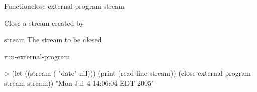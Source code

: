 \documentclass[10pt,twoside,english,pdftex]{article}
\begin{document}

\begin{functiondoc}{Function}{close-external-program-stream}{}
%
%

\fnsyntax

%
\fnpurpose Close a stream created by
\textbf{}

\fnpackage {}

\fnmodule {}

\fnargs
\begin{args}{stream}
\arg[stream] The stream to be closed
\end{args}

\begin{alsos}{run-external-program}
\end{alsos}

%
\fnexample
%
\W\supp
\begin{example}
> (let ((stream ( "date" nil)))
     (print (read-line stream))
     (close-external-program-stream stream))
"Mon Jul  4 14:06:04 EDT 2005" 
\end{example}

\end{functiondoc}

\end{document}
